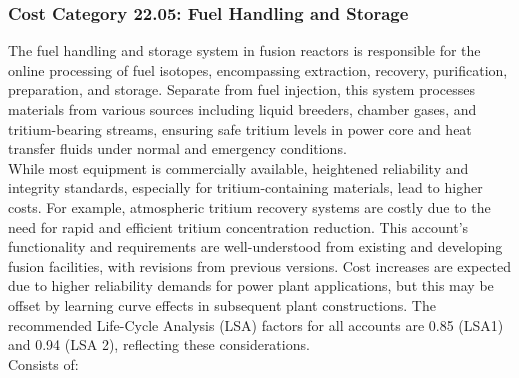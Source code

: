 
\subsubsection{Cost Category 22.05: Fuel Handling and Storage}

The fuel handling and storage system in fusion reactors is responsible for the online processing of fuel isotopes, encompassing extraction, recovery, purification, preparation, and storage. Separate from fuel injection, this system processes materials from various sources including liquid breeders, chamber gases, and tritium-bearing streams, ensuring safe tritium levels in power core and heat transfer fluids under normal and emergency conditions.  \\

While most equipment is commercially available, heightened reliability and integrity standards, especially for tritium-containing materials, lead to higher costs. For example, atmospheric tritium recovery systems are costly due to the need for rapid and efficient tritium concentration reduction. This account's functionality and requirements are well-understood from existing and developing fusion facilities, with revisions from previous versions. Cost increases are expected due to higher reliability demands for power plant applications, but this may be offset by learning curve effects in subsequent plant constructions. The recommended Life-Cycle Analysis (LSA) factors for all accounts are 0.85 (LSA1) and 0.94 (LSA 2), reflecting these considerations.\\

Consists of:

